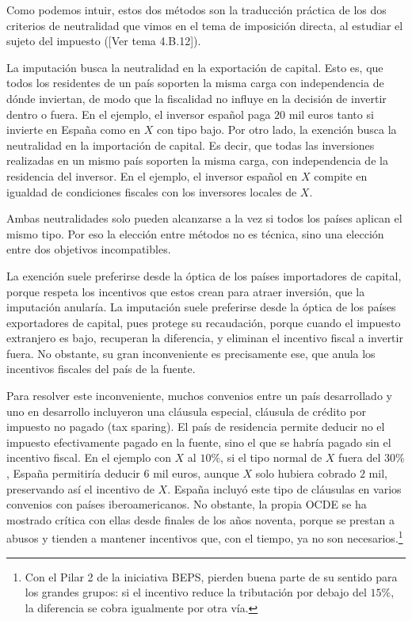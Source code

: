 \documentclass[10pt,a4paper]{article}
\newcommand{\authorfont}[1]{{\fontfamily{EBGaramond-TLF}\selectfont #1}}
\begin{document}
Como podemos intuir, estos dos métodos son la traducción práctica de los dos criterios de neutralidad que vimos en el tema de imposición directa, al estudiar el sujeto del impuesto ([\authorfont{Ver tema 4.B.12}]).

La imputación busca la neutralidad en la exportación de capital. Esto es, que todos los residentes de un país soporten la misma carga con independencia de dónde inviertan, de modo que la fiscalidad no influye en la decisión de invertir dentro o fuera. En el ejemplo, el inversor español paga $20$ mil euros tanto si invierte en España como en $X$ con tipo bajo. Por otro lado, la exención busca la neutralidad en la importación de capital. Es decir, que todas las inversiones realizadas en un mismo país soporten la misma carga, con independencia de la residencia del inversor. En el ejemplo, el inversor español en $X$ compite en igualdad de condiciones fiscales con los inversores locales de $X$.

Ambas neutralidades solo pueden alcanzarse a la vez si todos los países aplican el mismo tipo. Por eso la elección entre métodos no es técnica, sino una elección entre dos objetivos incompatibles.

La exención suele preferirse desde la óptica de los países importadores de capital, porque respeta los incentivos que estos crean para atraer inversión, que la imputación anularía. La imputación suele preferirse desde la óptica de los países exportadores de capital, pues protege su recaudación, porque cuando el impuesto extranjero es bajo, recuperan la diferencia, y eliminan el incentivo fiscal a invertir fuera. No obstante, su gran inconveniente es precisamente ese, que anula los incentivos fiscales del país de la fuente.

Para resolver este inconveniente, muchos convenios entre un país desarrollado y uno en desarrollo incluyeron una cláusula especial, cláusula de crédito por impuesto no pagado (tax sparing). El país de residencia permite deducir no el impuesto efectivamente pagado en la fuente, sino el que se habría pagado sin el incentivo fiscal. En el ejemplo con $X$ al $10\%$, si el tipo normal de $X$ fuera del $30\%$, España permitiría deducir $6$ mil euros, aunque $X$ solo hubiera cobrado $2$ mil, preservando así el incentivo de $X$. España incluyó este tipo de cláusulas en varios convenios con países iberoamericanos. No obstante, la propia OCDE se ha mostrado crítica con ellas desde finales de los años noventa, porque se prestan a abusos y tienden a mantener incentivos que, con el tiempo, ya no son necesarios.\footnote{%
    Con el Pilar 2 de la iniciativa BEPS, pierden buena parte de su sentido para los grandes grupos: si el incentivo reduce la tributación por debajo del $15\%$, la diferencia se cobra igualmente por otra vía.
}
\end{document}

